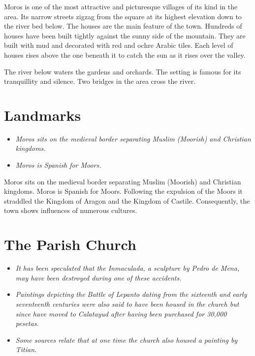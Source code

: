 Moros is one of the most attractive and picturesque villages of its kind
in the area. Its narrow streets zigzag from the square at its highest
elevation down to the river bed below. The houses are the main feature
of the town. Hundreds of houses have been built tightly against the
sunny side of the mountain. They are built with mud and decorated with
red and ochre Arabic tiles. Each level of houses rises above the one
beneath it to catch the sun as it rises over the valley.

The river below waters the gardens and orchards. The setting is famous
for its tranquillity and silence. Two bridges in the area cross the
river.

\section{Landmarks}\label{landmarks}

\begin{itemize}
\item
  \emph{Moros sits on the medieval border separating Muslim (Moorish)
  and Christian kingdoms.}
\item
  \emph{Moros is Spanish for Moors.}
\end{itemize}

Moros sits on the medieval border separating Muslim (Moorish) and
Christian kingdoms. Moros is Spanish for Moors. Following the expulsion
of the Moors it straddled the Kingdom of Aragon and the Kingdom of
Castile. Consequently, the town shows influences of numerous cultures.

\section{The Parish Church}\label{the-parish-church}

\begin{itemize}
\item
  \emph{It has been speculated that the Inmaculada, a sculpture by Pedro
  de Mena, may have been destroyed during one of these accidents.}
\item
  \emph{Paintings depicting the Battle of Lepanto dating from the
  sixteenth and early seventeenth centuries were also said to have been
  housed in the church but since have moved to Calatayud after having
  been purchased for 30,000 pesetas.}
\item
  \emph{Some sources relate that at one time the church also housed a
  painting by Titian.}
\end{itemize}

